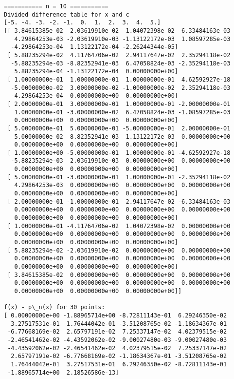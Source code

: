 \documentclass[11pt]{article}
\begin{document}
\begin{Verbatim}[commandchars=\\\{\}]
=========== n = 10 ===========
Divided difference table for x and c
[-5. -4. -3. -2. -1.  0.  1.  2.  3.  4.  5.]
[[ 3.84615385e-02  2.03619910e-02  1.04072398e-02  6.33484163e-03
   4.29864253e-03 -2.03619910e-03 -1.13122172e-03  1.08597285e-03
  -4.29864253e-04  1.13122172e-04 -2.26244344e-05]
 [ 5.88235294e-02  4.11764706e-02  2.94117647e-02  2.35294118e-02
  -5.88235294e-03 -8.82352941e-03  6.47058824e-03 -2.35294118e-03
   5.88235294e-04 -1.13122172e-04  0.00000000e+00]
 [ 1.00000000e-01  1.00000000e-01  1.00000000e-01  4.62592927e-18
  -5.00000000e-02  3.00000000e-02 -1.00000000e-02  2.35294118e-03
  -4.29864253e-04  0.00000000e+00  0.00000000e+00]
 [ 2.00000000e-01  3.00000000e-01  1.00000000e-01 -2.00000000e-01
   1.00000000e-01 -3.00000000e-02  6.47058824e-03 -1.08597285e-03
   0.00000000e+00  0.00000000e+00  0.00000000e+00]
 [ 5.00000000e-01  5.00000000e-01 -5.00000000e-01  2.00000000e-01
  -5.00000000e-02  8.82352941e-03 -1.13122172e-03  0.00000000e+00
   0.00000000e+00  0.00000000e+00  0.00000000e+00]
 [ 1.00000000e+00 -5.00000000e-01  1.00000000e-01 -4.62592927e-18
  -5.88235294e-03  2.03619910e-03  0.00000000e+00  0.00000000e+00
   0.00000000e+00  0.00000000e+00  0.00000000e+00]
 [ 5.00000000e-01 -3.00000000e-01  1.00000000e-01 -2.35294118e-02
   4.29864253e-03  0.00000000e+00  0.00000000e+00  0.00000000e+00
   0.00000000e+00  0.00000000e+00  0.00000000e+00]
 [ 2.00000000e-01 -1.00000000e-01  2.94117647e-02 -6.33484163e-03
   0.00000000e+00  0.00000000e+00  0.00000000e+00  0.00000000e+00
   0.00000000e+00  0.00000000e+00  0.00000000e+00]
 [ 1.00000000e-01 -4.11764706e-02  1.04072398e-02  0.00000000e+00
   0.00000000e+00  0.00000000e+00  0.00000000e+00  0.00000000e+00
   0.00000000e+00  0.00000000e+00  0.00000000e+00]
 [ 5.88235294e-02 -2.03619910e-02  0.00000000e+00  0.00000000e+00
   0.00000000e+00  0.00000000e+00  0.00000000e+00  0.00000000e+00
   0.00000000e+00  0.00000000e+00  0.00000000e+00]
 [ 3.84615385e-02  0.00000000e+00  0.00000000e+00  0.00000000e+00
   0.00000000e+00  0.00000000e+00  0.00000000e+00  0.00000000e+00
   0.00000000e+00  0.00000000e+00  0.00000000e+00]]

f(x) - p\_n(x) for 30 points:
[ 0.00000000e+00 -1.88965714e+00 -8.72811143e-01  6.29246350e-02
  3.27517531e-01  1.76444042e-01 -3.51208765e-02 -1.18634367e-01
 -6.77668169e-02  2.65797191e-02  7.25337147e-02  4.02379515e-02
 -2.46541462e-02 -4.43592062e-02 -9.00027480e-03 -9.00027480e-03
 -4.43592062e-02 -2.46541462e-02  4.02379515e-02  7.25337147e-02
  2.65797191e-02 -6.77668169e-02 -1.18634367e-01 -3.51208765e-02
  1.76444042e-01  3.27517531e-01  6.29246350e-02 -8.72811143e-01
 -1.88965714e+00  2.18526586e-13]


\end{Verbatim}
\end{document}
